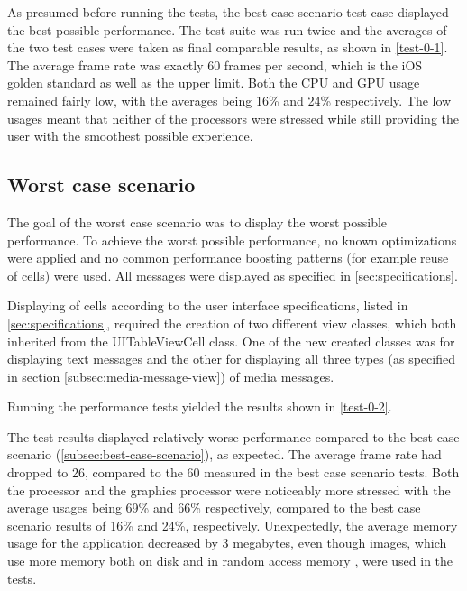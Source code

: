 \documentclass[a4paper,12pt]{article}
\begin{document}
As presumed before running the tests, the best case scenario test case displayed the best possible performance. The test suite was run twice and the averages of the two test cases were taken as final comparable results, as shown in \autoref{test-0-1}. The average frame rate was exactly 60 frames per second, which is the iOS golden standard\cite{IntroducingAsyncDisplayKit} as well as the upper limit\cite{WWDCFPSLimit}. Both the CPU and GPU usage remained fairly low, with the averages being 16\% and 24\% respectively. The low usages meant that neither of the processors were stressed while still providing the user with the smoothest possible experience.

\subsection{Worst case scenario}
\label{subsec:worst-case-scenario}
The goal of the worst case scenario was to display the worst possible performance. To achieve the worst possible performance, no known optimizations were applied and no common performance boosting patterns (for example reuse of cells) were used. All messages were displayed as specified in \autoref{sec:specifications}.

Displaying of cells according to the user interface specifications, listed in \autoref{sec:specifications}, required the creation of two different view classes, which both inherited from the UITableViewCell class. One of the new created classes was for displaying text messages and the other for displaying all three types (as specified in section \ref{subsec:media-message-view}) of media messages.

Running the performance tests yielded the results shown in \autoref{test-0-2}.

The test results displayed relatively worse performance compared to the best case scenario (\autoref{subsec:best-case-scenario}), as expected. The average frame rate had dropped to 26, compared to the 60 measured in the best case scenario tests. Both the processor and the graphics processor were noticeably more stressed with the average usages being 69\% and 66\% respectively, compared to the best case scenario results of 16\% and 24\%, respectively. Unexpectedly, the average memory usage for the application decreased by 3 megabytes, even though images, which use more memory both on disk and in random access memory \cite{UnderstandingFileSizes}, were used in the tests.
\end{document}
